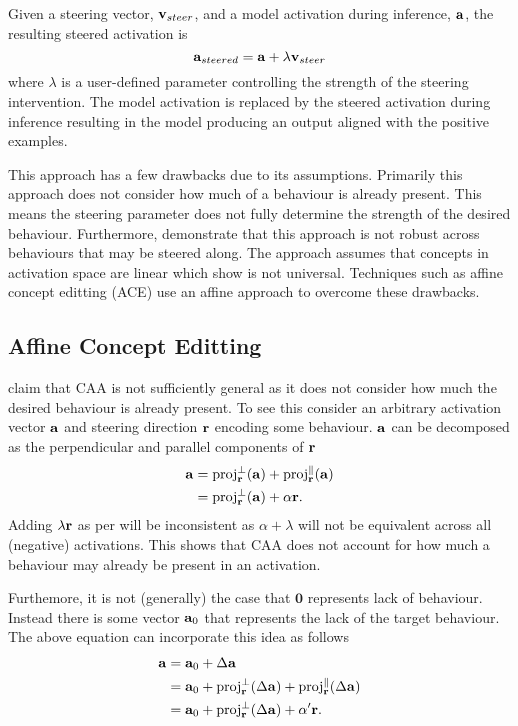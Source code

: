 Given a steering vector, $\mathbf{v}_{steer}$, and a model activation during inference, $\mathbf{a}$, the resulting steered activation is
\begin{equation}
    \label{eq:caa}
    \mathbf{a}_{steered} = \mathbf{a} + \lambda\mathbf{v}_{steer}
\end{equation}
where $\lambda$ is a user-defined parameter controlling the strength of the steering intervention.
The model activation is replaced by the steered activation during inference resulting in the model producing an output aligned with the positive examples.

This approach has a few drawbacks \cite{steerability, ace, non-linear-features} due to its assumptions.
Primarily this approach does not consider how much of a behaviour is already present.
This means the steering parameter does not fully determine the strength of the desired behaviour.
Furthermore, \citet{steerability} demonstrate that this approach is not robust across behaviours that may be steered along.
The approach assumes that concepts in activation space are linear which \citet{non-linear-features} show is not universal.
Techniques such as affine concept editting (ACE)  use an affine approach to overcome these drawbacks.

\subsection{Affine Concept Editting}
\label{ace}

\citet{ace} claim that CAA \cite{caa} is not sufficiently general as it does not consider how much the desired behaviour is already present.
To see this consider an arbitrary activation vector $\mathbf{a}$ and steering direction $\mathbf{r}$ encoding some behaviour.
$\mathbf{a}$ can be decomposed as the perpendicular and parallel components of $\mathbf{r}$
\begin{align*}
    \mathbf{a} &= \text{proj}_{\mathbf{r}}^{\perp}(\mathbf{a}) + \text{proj}_{\mathbf{r}}^{\parallel}(\mathbf{a}) \\
        &= \text{proj}_{\mathbf{r}}^{\perp}(\mathbf{a}) + \alpha\mathbf{r}.
\end{align*}
Adding $\lambda\mathbf{r}$ as per  will be inconsistent as $\alpha + \lambda$ will not be equivalent across all (negative) activations.
This shows that CAA \cite{caa} does not account for how much a behaviour may already be present in an activation.

Furthemore, it is not (generally) the case that $\mathbf{0}$ represents lack of behaviour.
Instead there is some vector $\mathbf{a}_0$ that represents the lack of the target behaviour.
The above equation can incorporate this idea as follows
\begin{align*}
    \mathbf{a} &= \mathbf{a}_0 + \Delta\mathbf{a} \\
        &= \mathbf{a}_0 + \text{proj}_{\mathbf{r}}^{\perp}(\Delta\mathbf{a}) + \text{proj}_{\mathbf{r}}^{\parallel}(\Delta\mathbf{a}) \\
        &= \mathbf{a}_0 + \text{proj}_{\mathbf{r}}^{\perp}(\Delta\mathbf{a}) + \alpha^\prime\mathbf{r}.
\end{align*}

